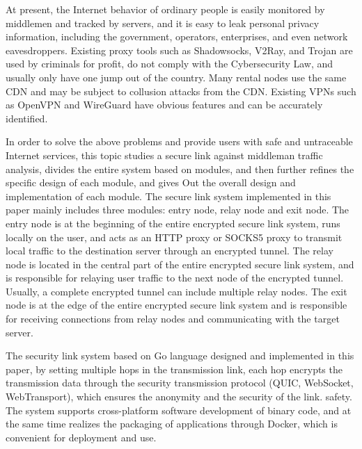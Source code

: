 \begin{eabstract}
At present, the Internet behavior of ordinary people is easily monitored by middlemen and tracked by servers, and it is easy to leak personal privacy information, including the government, operators, enterprises, and even network eavesdroppers.
Existing proxy tools such as Shadowsocks, V2Ray, and Trojan are used by criminals for profit, do not comply with the Cybersecurity Law, and usually only have one jump out of the country.
Many rental nodes use the same CDN and may be subject to collusion attacks from the CDN.
Existing VPNs such as OpenVPN and WireGuard have obvious features and can be accurately identified.
  
In order to solve the above problems and provide users with safe and untraceable Internet services, this topic studies a secure link against middleman traffic analysis, divides the entire system based on modules, and then further refines the specific design of each module, and gives Out the overall design and implementation of each module.
The secure link system implemented in this paper mainly includes three modules: entry node, relay node and exit node.
The entry node is at the beginning of the entire encrypted secure link system, runs locally on the user, and acts as an HTTP proxy or SOCKS5 proxy to transmit local traffic to the destination server through an encrypted tunnel.
The relay node is located in the central part of the entire encrypted secure link system, and is responsible for relaying user traffic to the next node of the encrypted tunnel. Usually, a complete encrypted tunnel can include multiple relay nodes.
The exit node is at the edge of the entire encrypted secure link system and is responsible for receiving connections from relay nodes and communicating with the target server.
  
The security link system based on Go language designed and implemented in this paper, by setting multiple hops in the transmission link, each hop encrypts the transmission data through the security transmission protocol (QUIC, WebSocket, WebTransport), which ensures the anonymity and the security of the link. safety.
The system supports cross-platform software development of binary code, and at the same time realizes the packaging of applications through Docker, which is convenient for deployment and use.
\end{eabstract}
